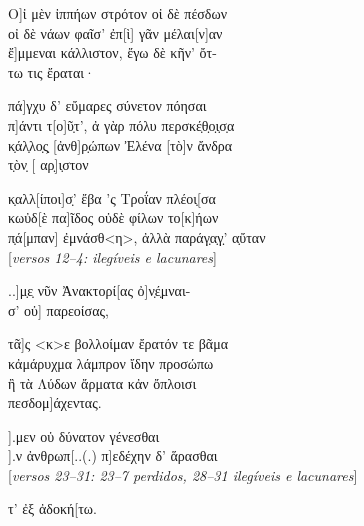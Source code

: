 \begin{gkverse}
Ο]ἰ μὲν ἰππήων στρότον οἰ δὲ πέσδων\\
οἰ δὲ νάων φαῖσ’ ἐπ[ὶ] γᾶν μέλαι[ν]αν\\
ἔ]μμεναι κάλλιστον, ἔγω δὲ κῆν’ ὄτ-\\
τω τις ἔραται·

πά]γχυ δ’ εὔμαρες σύνετον πόησαι\\
π]άντι τ[ο]ῦ̣τ’, ἀ γὰρ πόλυ περσκέ̣θ̣ο̣ι̣σ̣α\\
κ̣άλ̣λο̣ς̣ [ἀνθ]ρ̣ώπων Ἐλένα [τὸ]ν ἄνδρα\\
τ̣ὸν̣ [    αρ̣]ι̣στον

κ̣αλλ[ίποι]σ̣’ ἔβα ’ς Τροΐαν πλέοι̣[σα\\
κωὐδ[ὲ πα]ῖδος οὐδὲ φίλων το[κ]ήων\\
π̣ά[μπαν] ἐμνάσθ<η>, ἀλλὰ παράγ̣α̣γ̣’ α̣ὔταν\\

\textnormal{[\textit{versos 12--4: ilegíveis e lacunares}]}

..]μ̣ε̣ νῦν Ἀνακτορί[ας ὀ]ν̣έ̣μναι-\\
σ’ οὐ] παρεοίσας,

τᾶ]ς <κ>ε βολλοίμαν ἔρατόν τε βᾶμα\\
κἀμάρυχμα λάμπρον ἴδην προσώπω\\
ἢ τὰ Λύδων ἄρματα κἀν ὄπλοισι\\
πεσδομ]άχεντας.

			   ].μεν οὑ δύνατον γένεσθαι\\
		   ].ν ἀνθρωπ[..(.) π]εδέχην δ’ ἅρασθαι\\

\textnormal{[\textit{versos 23--31: 23--7 perdidos, 28--31 ilegíveis e lacunares}]}


     τ’ ἐξ ἀδοκή[τω.
\end{gkverse}

\chapter*{}
\section*{}
\section*{}

